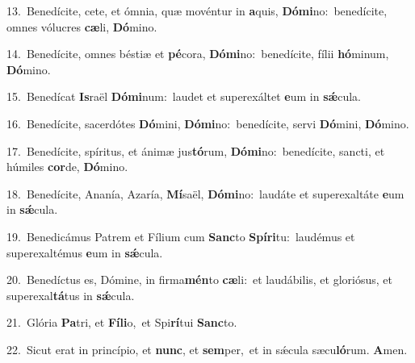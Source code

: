 {\numbfont\textcolor{\numbcolor}{13.}}~Benedícite, cete, et ómnia, quæ movéntur in \textbf{a}\-quis, \textbf{Dó}\-\textbf{mi}no:~\star benedícite, omnes vólucres \textbf{cæ}\-li, \textbf{Dó}\-mino.\par
{\numbfont\textcolor{\numbcolor}{14.}}~Benedícite, omnes béstiæ et \textbf{pé}\-cora, \textbf{Dó}\-\textbf{mi}no:~\star benedícite, fílii \textbf{hó}\-minum, \textbf{Dó}\-mino.\par
{\numbfont\textcolor{\numbcolor}{15.}}~Benedícat \textbf{Is}\-raël \textbf{Dó}\-\textbf{mi}num:~\star laudet et superexáltet \textbf{e}\-um in \textbf{sǽ}\-cula.\par
{\numbfont\textcolor{\numbcolor}{16.}}~Benedícite, sacerdótes \textbf{Dó}\-mini, \textbf{Dó}\-\textbf{mi}no:~\star benedícite, servi \textbf{Dó}\-mini, \textbf{Dó}\-mino.\par
{\numbfont\textcolor{\numbcolor}{17.}}~Benedícite, spíritus, et ánimæ jus\-\textbf{tó}\-rum, \textbf{Dó}\-\textbf{mi}no:~\star benedícite, sancti, et húmiles \textbf{cor}\-de, \textbf{Dó}\-mino.\par
{\numbfont\textcolor{\numbcolor}{18.}}~Benedícite, Ananía, Azaría, \textbf{Mí}\-saël, \textbf{Dó}\-\textbf{mi}no:~\star laudáte et superexaltáte \textbf{e}\-um in \textbf{sǽ}\-cula.\par
{\numbfont\textcolor{\numbcolor}{19.}}~Benedicámus Patrem et Fílium cum \textbf{Sanc}\-to \textbf{Spí}\-\textbf{ri}tu:~\star laudémus et superexaltémus \textbf{e}\-um in \textbf{sǽ}\-cula.\par
{\numbfont\textcolor{\numbcolor}{20.}}~Benedíctus es, Dómine, in firma\-\textbf{mén}\-to \textbf{cæ}\-li:~\star et laudábilis, et gloriósus, et superexal\-\textbf{tá}\-tus in \textbf{sǽ}\-cula.\par
{\numbfont\textcolor{\numbcolor}{21.}}~Glória \textbf{Pa}\-tri, et \textbf{Fí}\-\textbf{li}o,~\star et Spi\-\textbf{rí}\-tui \textbf{Sanc}\-to.\par
{\numbfont\textcolor{\numbcolor}{22.}}~Sicut erat in princípio, et \textbf{nunc}\-, et \textbf{sem}\-per,~\star et in sǽcula sæcu\-\textbf{ló}\-rum. \textbf{A}\-men.\par
